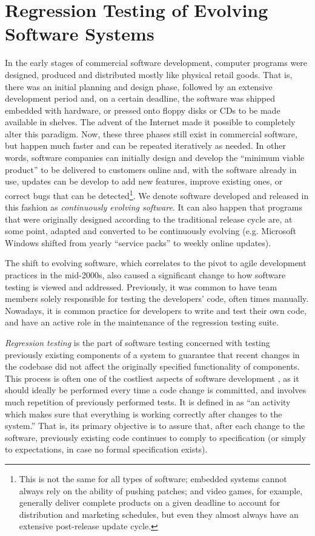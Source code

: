 \section{Regression Testing of Evolving Software Systems}
\label{sec:regression}

In the early stages of commercial software development, computer programs were designed, produced and distributed mostly like physical retail goods.
That is, there was an initial planning and design phase, followed by an extensive development period and, on a certain deadline, the software was shipped embedded with hardware, or pressed onto floppy disks or CDs to be made available in shelves.
The advent of the Internet made it possible to completely alter this paradigm.
Now, these three phases still exist in commercial software, but happen much faster and can be repeated iteratively as needed.
In other words, software companies can initially design and develop the ``minimum viable product'' to be delivered to customers online and, with the software already in use, updates can be develop to add new features, improve existing ones, or correct bugs that can be detected\footnote{This is not the same for all types of software; embedded systems cannot always rely on the ability of pushing patches; and video games, for example, generally deliver complete products on a given deadline to account for distribution and marketing schedules, but even they almost always have an extensive post-release update cycle.}.
We denote software developed and released in this fashion as \textit{continuously evolving software}.
It can also happen that programs that were originally designed according to the traditional release cycle are, at some point, adapted and converted to be continuously evolving (e.g. Microsoft Windows shifted from yearly ``service packs'' to weekly online updates).

The shift to evolving software, which correlates to the pivot to agile development practices in the mid-2000s, also caused a significant change to how software testing is viewed and addressed.
Previously, it was common to have team members solely responsible for testing the developers' code, often times manually.
Nowadays, it is common practice for developers to write and test their own code, and have an active role in the maintenance of the regression testing suite.

\textit{Regression testing} is the part of software testing concerned with testing previously existing components of a system to guarantee that recent changes in the codebase did not affect the originally specified functionality of components.
This process is often one of the costliest aspects of software development \cite{rothermel_improving_2018}, as it should ideally be performed every time a code change is committed, and involves much repetition of previously performed tests.
It is defined in \cite{minhas_regression_2017} as ``an activity which makes sure that everything is working correctly after changes to the system.''
That is, its primary objective is to assure that, after each change to the software, previously existing code continues to comply to specification (or simply to expectations, in case no formal specification exists).

